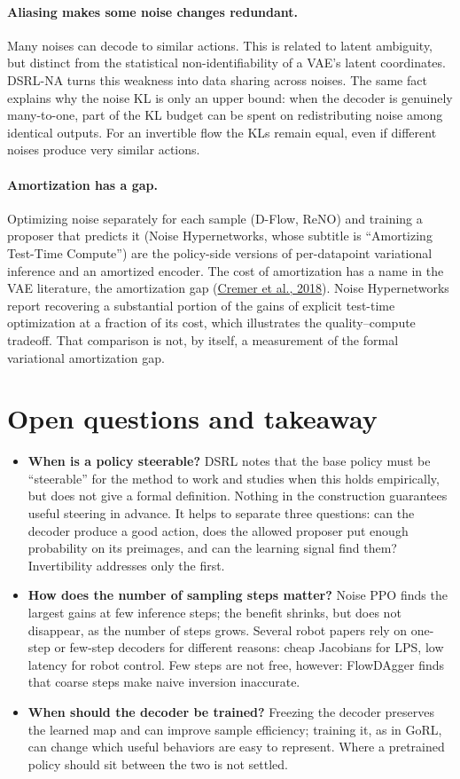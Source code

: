 \paragraph{Aliasing makes some noise changes redundant.} Many noises can decode to similar actions. This is related to latent ambiguity, but distinct from the statistical non-identifiability of a VAE's latent coordinates. DSRL-NA turns this weakness into data sharing across noises. The same fact explains why the noise KL is only an upper bound: when the decoder is genuinely many-to-one, part of the KL budget can be spent on redistributing noise among identical outputs. For an invertible flow the KLs remain equal, even if different noises produce very similar actions.

\paragraph{Amortization has a gap.} Optimizing noise separately for each sample (D-Flow, ReNO) and training a proposer that predicts it (Noise Hypernetworks, whose subtitle is ``Amortizing Test-Time Compute'') are the policy-side versions of per-datapoint variational inference and an amortized encoder. The cost of amortization has a name in the VAE literature, the amortization gap (\hyperlink{ref:2}{Cremer et al., 2018}). Noise Hypernetworks report recovering a substantial portion of the gains of explicit test-time optimization at a fraction of its cost, which illustrates the quality--compute tradeoff. That comparison is not, by itself, a measurement of the formal variational amortization gap.

\section{Open questions and takeaway}
\label{sec:7}
\begin{itemize}
\item \textbf{When is a policy steerable?} DSRL notes that the base policy must be ``steerable'' for the method to work and studies when this holds empirically, but does not give a formal definition. Nothing in the construction guarantees useful steering in advance. It helps to separate three questions: can the decoder produce a good action, does the allowed proposer put enough probability on its preimages, and can the learning signal find them? Invertibility addresses only the first.
\item \textbf{How does the number of sampling steps matter?} Noise PPO finds the largest gains at few inference steps; the benefit shrinks, but does not disappear, as the number of steps grows. Several robot papers rely on one-step or few-step decoders for different reasons: cheap Jacobians for LPS, low latency for robot control. Few steps are not free, however: FlowDAgger finds that coarse steps make naive inversion inaccurate.
\item \textbf{When should the decoder be trained?} Freezing the decoder preserves the learned map and can improve sample efficiency; training it, as in GoRL, can change which useful behaviors are easy to represent. Where a pretrained policy should sit between the two is not settled.
\end{itemize}

